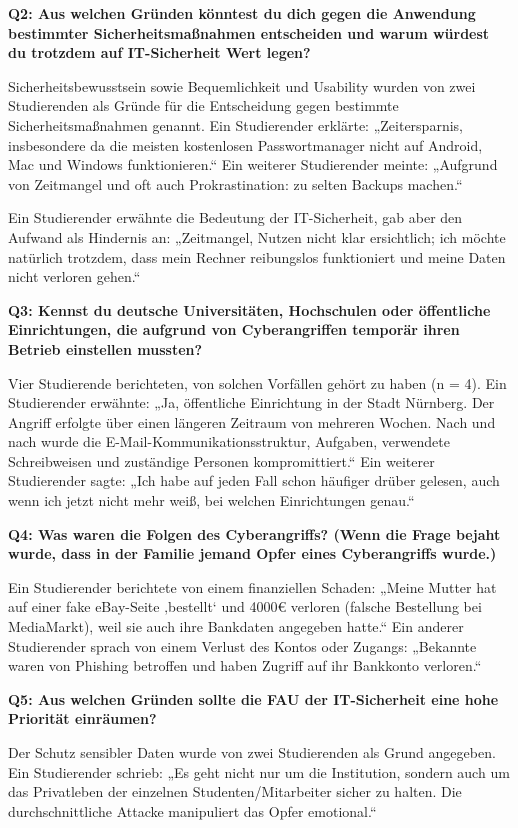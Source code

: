 \documentclass[german,report]{i1thesis}
\begin{document}
\textbf{Q2: Aus welchen Gründen könntest du dich gegen die Anwendung bestimmter Sicherheitsmaßnahmen entscheiden und warum würdest du trotzdem auf IT-Sicherheit Wert legen?}

Sicherheitsbewusstsein sowie Bequemlichkeit und Usability wurden von zwei Studierenden als Gründe für die Entscheidung gegen bestimmte Sicherheitsmaßnahmen genannt. Ein Studierender erklärte: „Zeitersparnis, insbesondere da die meisten kostenlosen Passwortmanager nicht auf Android, Mac und Windows funktionieren.“ Ein weiterer Studierender meinte: „Aufgrund von Zeitmangel und oft auch Prokrastination: zu selten Backups machen.“

Ein Studierender erwähnte die Bedeutung der IT-Sicherheit, gab aber den Aufwand als Hindernis an: „Zeitmangel, Nutzen nicht klar ersichtlich; ich möchte natürlich trotzdem, dass mein Rechner reibungslos funktioniert und meine Daten nicht verloren gehen.“

\textbf{Q3: Kennst du deutsche Universitäten, Hochschulen oder öffentliche Einrichtungen, die aufgrund von Cyberangriffen temporär ihren Betrieb einstellen mussten?}

Vier Studierende berichteten, von solchen Vorfällen gehört zu haben (n = 4). Ein Studierender erwähnte: „Ja, öffentliche Einrichtung in der Stadt Nürnberg. Der Angriff erfolgte über einen längeren Zeitraum von mehreren Wochen. Nach und nach wurde die E-Mail-Kommunikationsstruktur, Aufgaben, verwendete Schreibweisen und zuständige Personen kompromittiert.“ Ein weiterer Studierender sagte: „Ich habe auf jeden Fall schon häufiger drüber gelesen, auch wenn ich jetzt nicht mehr weiß, bei welchen Einrichtungen genau.“

\textbf{Q4: Was waren die Folgen des Cyberangriffs? (Wenn die Frage bejaht wurde, dass in der Familie jemand Opfer eines Cyberangriffs wurde.)}

Ein Studierender berichtete von einem finanziellen Schaden: „Meine Mutter hat auf einer fake eBay-Seite ‚bestellt‘ und 4000€ verloren (falsche Bestellung bei MediaMarkt), weil sie auch ihre Bankdaten angegeben hatte.“ Ein anderer Studierender sprach von einem Verlust des Kontos oder Zugangs: „Bekannte waren von Phishing betroffen und haben Zugriff auf ihr Bankkonto verloren.“

\textbf{Q5: Aus welchen Gründen sollte die FAU der IT-Sicherheit eine hohe Priorität einräumen?}

Der Schutz sensibler Daten wurde von zwei Studierenden als Grund angegeben. Ein Studierender schrieb: „Es geht nicht nur um die Institution, sondern auch um das Privatleben der einzelnen Studenten/Mitarbeiter sicher zu halten. Die durchschnittliche Attacke manipuliert das Opfer emotional.“
\end{document}
